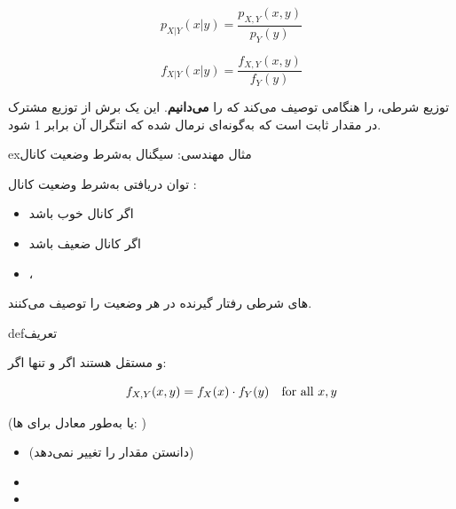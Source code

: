 

\[p_{X|Y}(x|y) = \frac{p_{X,Y}(x,y)}{p_Y(y)}\]


\[f_{X|Y}(x|y) = \frac{f_{X,Y}(x,y)}{f_Y(y)}\]


توزیع شرطی،  را هنگامی توصیف می‌کند که  را \textbf{می‌دانیم}. این یک برش از توزیع مشترک در مقدار ثابت  است که به‌گونه‌ای نرمال شده که انتگرال آن برابر 1 شود.

\begin{PSbox}[unbreakable]{ex}{مثال مهندسی: سیگنال به‌شرط وضعیت کانال}

توان دریافتی  به‌شرط وضعیت کانال :

\begin{itemize}
\tightlist
\item
  اگر کانال خوب باشد 
\item
  اگر کانال ضعیف باشد 
\item
  ، 
\end{itemize}

‌های شرطی رفتار گیرنده در هر وضعیت را توصیف می‌کنند.

\end{PSbox}


\begin{PSbox}[unbreakable]{def}{تعریف}

 و  مستقل هستند اگر و تنها اگر:

\[f_{X,Y}(x,y) = f_X(x) \cdot f_Y(y) \quad \text{for all } x, y\]

(یا به‌طور معادل برای ‌ها: )

\end{PSbox}


\begin{itemize}
\tightlist
\item
   (دانستن  مقدار  را تغییر نمی‌دهد)
\item
\item
\end{itemize}

